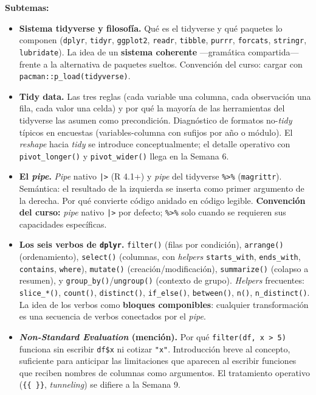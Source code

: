 \documentclass[11pt,letterpaper]{article}
\begin{document}
\textbf{Subtemas:}

\begin{itemize}[leftmargin=*, itemsep=2pt]
    \item \textbf{Sistema tidyverse y filosofía.} Qué es el tidyverse y qué paquetes lo componen (\texttt{dplyr}, \texttt{tidyr}, \texttt{ggplot2}, \texttt{readr}, \texttt{tibble}, \texttt{purrr}, \texttt{forcats}, \texttt{stringr}, \texttt{lubridate}). La idea de un \textbf{sistema coherente} ---gramática compartida--- frente a la alternativa de paquetes sueltos. Convención del curso: cargar con \texttt{pacman::p\_load(tidyverse)}.
    \item \textbf{Tidy data.} Las tres reglas (cada variable una columna, cada observación una fila, cada valor una celda) y por qué la mayoría de las herramientas del tidyverse las asumen como precondición. Diagnóstico de formatos no-\textit{tidy} típicos en encuestas (variables-columna con sufijos por año o módulo). El \textit{reshape} hacia \textit{tidy} se introduce conceptualmente; el detalle operativo con \texttt{pivot\_longer()} y \texttt{pivot\_wider()} llega en la Semana 6.
    \item \textbf{El \textit{pipe}.} \textit{Pipe} nativo \texttt{|>} (R 4.1+) y \textit{pipe} del tidyverse \texttt{\%>\%} (\texttt{magrittr}). Semántica: el resultado de la izquierda se inserta como primer argumento de la derecha. Por qué convierte código anidado en código legible. \textbf{Convención del curso:} \textit{pipe} nativo \texttt{|>} por defecto; \texttt{\%>\%} solo cuando se requieren sus capacidades específicas.
    \item \textbf{Los seis verbos de \texttt{dplyr}.} \texttt{filter()} (filas por condición), \texttt{arrange()} (ordenamiento), \texttt{select()} (columnas, con \textit{helpers} \texttt{starts\_with}, \texttt{ends\_with}, \texttt{contains}, \texttt{where}), \texttt{mutate()} (creación/modificación), \texttt{summarize()} (colapso a resumen), y \texttt{group\_by()}/\texttt{ungroup()} (contexto de grupo). \textit{Helpers} frecuentes: \texttt{slice\_*()}, \texttt{count()}, \texttt{distinct()}, \texttt{if\_else()}, \texttt{between()}, \texttt{n()}, \texttt{n\_distinct()}. La idea de los verbos como \textbf{bloques componibles}: cualquier transformación es una secuencia de verbos conectados por el \textit{pipe}.
    \item \textbf{\textit{Non-Standard Evaluation} (mención).} Por qué \texttt{filter(df, x > 5)} funciona sin escribir \texttt{df\$x} ni cotizar \texttt{"x"}. Introducción breve al concepto, suficiente para anticipar las limitaciones que aparecen al escribir funciones que reciben nombres de columnas como argumentos. El tratamiento operativo (\texttt{\{\{~\}\}}, \textit{tunneling}) se difiere a la Semana 9.
\end{itemize}
\end{document}
